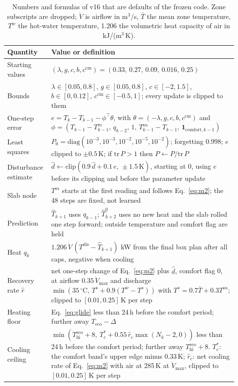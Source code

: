 \documentclass{article}
\begin{document}
\begin{table}[H]\centering
\caption{Numbers and formulas of v16 that are defaults of the frozen code. Zone subscripts are dropped; $\dot V$ is airflow in m$^3$/s, $\bar T$ the mean zone temperature, $T^{w}$ the hot-water temperature, 1.206 the volumetric heat capacity of air in kJ/(m$^3$\,K).}\label{tab:numbers}
\footnotesize
\begin{tabular}{p{0.16\linewidth}p{0.78\linewidth}}\toprule
Quantity & Value or definition\\\midrule
Starting values & $(\lambda,g,c,b,c^{\mathrm{cm}})=(0.33,\,0.27,\,0.09,\,0.016,\,0.25)$\\
Bounds & $\lambda\in[0.05,0.8]$, $g\in[0.05,0.8]$, $c\in[-2,1.5]$, $b\in[0,0.12]$, $c^{\mathrm{cm}}\in[-0.5,1]$; every update is clipped to them\\
One-step error & $e=T_k-T_{k-1}-\phi^{\top}\theta$, with $\theta=(-\lambda,g,c,b,c^{\mathrm{cm}})$ and $\phi=(T_{k-1}-T^{m}_{k-1},\,q_{k-2},\,1,\,T^{\mathrm{oa}}_{k-1}-T_{k-1},\,\mathbf{1}_{\mathrm{comfort},k-1})$\\
Least squares & $P_0=\mathrm{diag}(10^{-3},10^{-3},10^{-2},10^{-5},10^{-2})$; forgetting 0.998; $e$ clipped to $\pm0.5$\,K; if $\mathrm{tr}\,P>1$ then $P\gets P/\mathrm{tr}\,P$\\
Disturbance estimate & $\hat d\gets\mathrm{clip}(0.9\,\hat d+0.1\,e,\,\pm1.5\,\mathrm{K})$, starting at 0, using $e$ before its clipping and before the parameter update\\
Slab node & $T^{m}$ starts at the first reading and follows Eq.~\ref{eq:m2}; the 48 steps are fixed, not learned\\
Prediction & $\hat T_{k+1}$ uses $q_{k-1}$; $\hat T^{0}_{k+2}$ uses no new heat and the slab rolled one step forward; outside temperature and comfort flag are held\\
Heat $q_k$ & $1.206\,\dot V\,(T^{\mathrm{dis}}-\hat T_{k+1})$ kW from the final box plan after all caps, negative when cooling\\
Recovery rate $\hat r$ & net one-step change of Eq.~\ref{eq:m2} plus $\hat d$, comfort flag 0, at airflow $0.35\,\dot V_{\max}$ and discharge $\min(35\,^\circ\mathrm{C},\,T^{s}+0.9(T^{w}-T^{s}))$ with $T^{s}=0.7\bar T+0.3T^{\mathrm{oa}}$; clipped to $[0.01,0.25]$\,K per step\\
Heating floor & Eq.~\ref{eq:glide} less than 24\,h before the comfort period; further away $T_{\mathrm{eco}}-\Delta$\\
Cooling ceiling & $\min(T^{\mathrm{eco}}_{\mathrm{hi}}+8,\ T^{*}_{c}+0.55\,\hat r_{c}\max(N_k-2,0))$ less than 24\,h before the comfort period; further away $T^{\mathrm{eco}}_{\mathrm{hi}}+8$. $T^{*}_{c}$: the comfort band's upper edge minus 0.33\,K; $\hat r_{c}$: net cooling rate of Eq.~\ref{eq:m2} with air at 285\,K at $\dot V_{\max}$, clipped to $[0.01,0.25]$\,K per step\\

\end{tabular}
\end{table}
\end{document}
